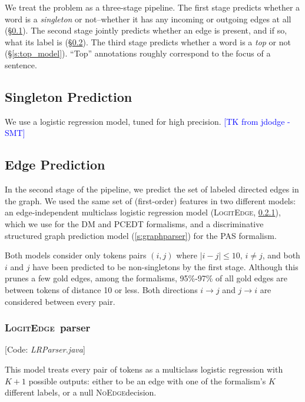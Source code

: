 \documentclass[11pt]{article}
\newcommand{\sam}[1]{\textcolor{blue}{[#1 -SMT]}}
\newcommand{\codenote}[1]{\textcolor{PineGreen}{[Code: \emph{#1}]}}
\newcommand{\logitedge}{\textsc{LogitEdge}}
\newcommand{\noedge}{\textsc{NoEdge}}
\begin{document}
We treat the problem as a three-stage pipeline.
The first stage predicts whether a word is a \emph{singleton} or not--whether it
has any incoming or outgoing edges at all (\S\ref{s:singleton_model}).
The second stage jointly predicts whether an edge is present, and if so, what
its label is (\S\ref{s:edge_model}).
The third stage predicts whether a word is a \emph{top} or not
(\S\ref{s:top_model}).
``Top'' annotations roughly correspond to the focus of a
sentence.


\subsection{Singleton Prediction} \label{s:singleton_model}

We use a logistic regression model, tuned for high precision.
\sam{TK from jdodge}

\subsection{Edge Prediction} \label{s:edge_model}

In the second stage of the pipeline, we predict the set of labeled directed
edges in the graph.
We used the same set of (first-order) features
in two different models: an edge-independent multiclass %
logistic regression model (\logitedge, \ref{s:logitedge}), which we use for the
DM and PCEDT formalisms, and a discriminative structured graph prediction model
(\ref{s:graphparser}) for the PAS formalism.

Both models consider only tokens pairs $(i, j)$ where %
$|i-j| \leq 10$, $i \ne j$, and both $i$ and
$j$ have been predicted to be non-singletons by the first stage.
Although this prunes a few gold edges, among the formalisms, 95\%-97\% of all
gold edges are between tokens of distance 10 or less.
Both directions $i \rightarrow j$ and $j \rightarrow i$ are considered between
every pair.


\subsubsection{\logitedge\ parser} \label{s:logitedge}


\codenote{LRParser.java}

\noindent
This model treats every pair of tokens as a multiclass logistic regression
with $K+1$ possible outputs:
either to be an edge with one of the formalism's $K$ different labels, or a null
\noedge decision.  
\end{document}
